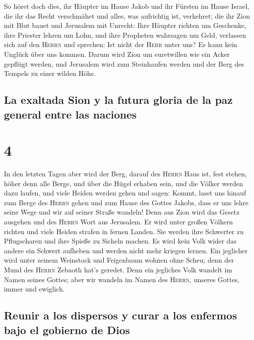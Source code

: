  So höret doch dies, ihr Häupter im Hause Jakob und ihr
Fürsten im Hause Israel, die ihr das Recht verschmähet und alles, was
aufrichtig ist, verkehret;  die ihr Zion mit Blut bauet
und Jerusalem mit Unrecht:  Ihre Häupter richten um
Geschenke, ihre Priester lehren um Lohn, und ihre Propheten wahrsagen um
Geld, verlassen sich auf den \textsc{Herrn} und sprechen: Ist nicht der
\textsc{Herr} unter uns? Es kann kein Unglück über uns kommen.
 Darum wird Zion um euretwillen wie ein Acker gepflügt
werden, und Jerusalem wird zum Steinhaufen werden und der Berg des
Tempels zu einer wilden Höhe.

\hypertarget{la-exaltada-sion-y-la-futura-gloria-de-la-paz-general-entre-las-naciones}{%
\subsection{La exaltada Sion y la futura gloria de la paz general entre
las
naciones}\label{la-exaltada-sion-y-la-futura-gloria-de-la-paz-general-entre-las-naciones}}

\hypertarget{section-3}{%
\section{4}\label{section-3}}

 In den letzten Tagen aber wird der Berg, darauf des
\textsc{Herrn} Haus ist, fest stehen, höher denn alle Berge, und über
die Hügel erhaben sein, und die Völker werden dazu laufen,
 und viele Heiden werden gehen und sagen: Kommt, lasst uns
hinauf zum Berge des \textsc{Herrn} gehen und zum Hause des Gottes
Jakobs, dass er uns lehre seine Wege und wir auf seiner Straße wandeln!
Denn aus Zion wird das Gesetz ausgehen und des \textsc{Herrn} Wort aus
Jerusalem.  Er wird unter großen Völkern richten und viele
Heiden strafen in fernen Landen. Sie werden ihre Schwerter zu
Pflugscharen und ihre Spieße zu Sicheln machen. Es wird kein Volk wider
das andere ein Schwert aufheben und werden nicht mehr kriegen lernen.
 Ein jeglicher wird unter seinem Weinstock und Feigenbaum
wohnen ohne Scheu; denn der Mund des \textsc{Herrn} Zebaoth hat's
geredet.  Denn ein jegliches Volk wandelt im Namen seines
Gottes; aber wir wandeln im Namen des \textsc{Herrn}, unseres Gottes,
immer und ewiglich.

\hypertarget{reunir-a-los-dispersos-y-curar-a-los-enfermos-bajo-el-gobierno-de-dios}{%
\subsection{Reunir a los dispersos y curar a los enfermos bajo el
gobierno de
Dios}\label{reunir-a-los-dispersos-y-curar-a-los-enfermos-bajo-el-gobierno-de-dios}}

